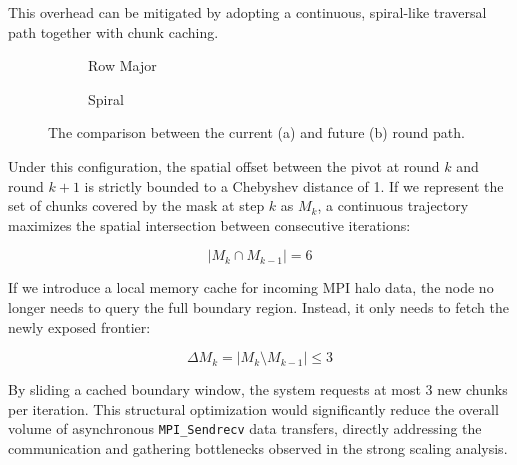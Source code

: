 This overhead can be mitigated by adopting a continuous, spiral-like traversal path together with chunk caching. 
\begin{figure}[H]
\centering
\begin{subfigure}[b]{0.48\textwidth}
\centering
{}
\caption{Row Major}
\end{subfigure}
\begin{subfigure}[b]{0.48\textwidth}
\centering
{}
\caption{Spiral}
\end{subfigure}
\caption{The comparison between the current (a) and future (b) round path.}
\end{figure}

Under this configuration, the spatial offset between the pivot at round $k$ and round $k+1$ is strictly bounded to a Chebyshev distance of 1. If we represent the set of chunks covered by the mask at step $k$ as $M_k$, a continuous trajectory maximizes the spatial intersection between consecutive iterations:

$$ |M_k \cap M_{k-1}| = 6 $$

If we introduce a local memory cache for incoming MPI halo data, the node no longer needs to query the full boundary region. Instead, it only needs to fetch the newly exposed frontier:

$$ \Delta M_k = |M_k \setminus M_{k-1}| \le 3 $$

By sliding a cached boundary window, the system requests at most 3 new chunks per iteration. This structural optimization would significantly reduce the overall volume of asynchronous \texttt{MPI\_Sendrecv} data transfers, directly addressing the communication and gathering bottlenecks observed in the strong scaling analysis.


